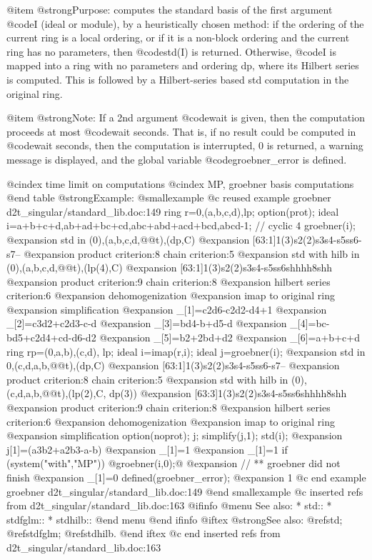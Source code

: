 @item @strong{Purpose:}
computes the standard basis of the first argument @code{I}
(ideal or module), by a heuristically chosen method: if the
ordering of the current ring is a local ordering, or if it is a
non-block ordering and the current ring has no parameters, then
@code{std(I)} is returned. Otherwise, @code{I} is mapped into a
ring with no parameters and ordering dp, where its Hilbert series
is computed. This is followed by a Hilbert-series based std
computation in the original ring.

@item @strong{Note:}
If a 2nd argument @code{wait} is given, then the computation proceeds
at most @code{wait} seconds. That is, if no result could be computed in
@code{wait} seconds, then the computation is interrupted, 0 is returned,
a warning message is displayed, and the global variable
@code{groebner_error} is defined.

@cindex time limit on computations
@cindex MP, groebner basis computations
@end table
@strong{Example:}
@smallexample
@c reused example groebner d2t_singular/standard_lib.doc:149 
  ring r=0,(a,b,c,d),lp;
option(prot);
ideal i=a+b+c+d,ab+ad+bc+cd,abc+abd+acd+bcd,abcd-1; // cyclic 4
groebner(i);
@expansion{} std in (0),(a,b,c,d,@@t),(dp,C)
@expansion{} [63:1]1(3)s2(2)s3s4-s5ss6-s7--
@expansion{} product criterion:8 chain criterion:5
@expansion{} std with hilb in  (0),(a,b,c,d,@@t),(lp(4),C)
@expansion{} [63:1]1(3)s2(2)s3s4-s5ss6shhhh8shh
@expansion{} product criterion:9 chain criterion:8
@expansion{} hilbert series criterion:6
@expansion{} dehomogenization
@expansion{} imap to original ring
@expansion{} simplification
@expansion{} _[1]=c2d6-c2d2-d4+1
@expansion{} _[2]=c3d2+c2d3-c-d
@expansion{} _[3]=bd4-b+d5-d
@expansion{} _[4]=bc-bd5+c2d4+cd-d6-d2
@expansion{} _[5]=b2+2bd+d2
@expansion{} _[6]=a+b+c+d
ring rp=(0,a,b),(c,d), lp;
ideal i=imap(r,i);
ideal j=groebner(i);
@expansion{} std in 0,(c,d,a,b,@@t),(dp,C)
@expansion{} [63:1]1(3)s2(2)s3s4-s5ss6-s7--
@expansion{} product criterion:8 chain criterion:5
@expansion{} std with hilb in  (0),(c,d,a,b,@@t),(lp(2),C, dp(3))
@expansion{} [63:3]1(3)s2(2)s3s4-s5ss6shhhh8shh
@expansion{} product criterion:9 chain criterion:8
@expansion{} hilbert series criterion:6
@expansion{} dehomogenization
@expansion{} imap to original ring
@expansion{} simplification
option(noprot);
j; simplify(j,1); std(i);
@expansion{} j[1]=(a3b2+a2b3-a-b)
@expansion{} _[1]=1
@expansion{} _[1]=1
if (system("with","MP")) @{groebner(i,0);@}
@expansion{} // ** groebner did not finish
@expansion{} _[1]=0
defined(groebner_error);
@expansion{} 1
@c end example groebner d2t_singular/standard_lib.doc:149
@end smallexample
@c inserted refs from d2t_singular/standard_lib.doc:163
@ifinfo
@menu
See also:
* std::
* stdfglm::
* stdhilb::
@end menu
@end ifinfo
@iftex
@strong{See also:}
@ref{std};
@ref{stdfglm};
@ref{stdhilb}.
@end iftex
@c end inserted refs from d2t_singular/standard_lib.doc:163

